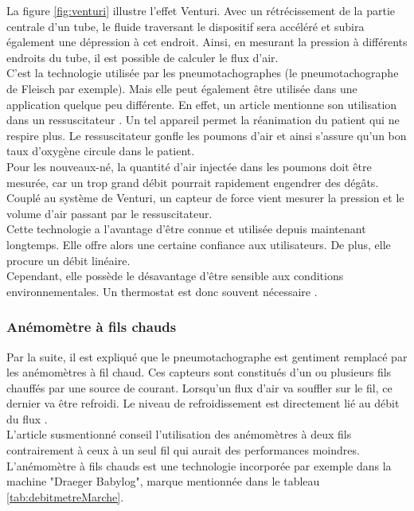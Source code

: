 La figure \ref{fig:venturi} illustre l'effet Venturi. Avec un rétrécissement de la partie centrale d'un tube, le fluide traversant le dispositif 
sera accéléré et subira également une dépression à cet endroit. Ainsi, en mesurant la pression à différents endroits du tube, il est possible 
de calculer le flux d'air. \\

C'est la technologie utilisée par les pneumotachographes (le pneumotachographe de Fleisch par exemple). Mais elle peut également être utilisée 
dans une application quelque peu différente. En effet, un article mentionne son utilisation dans un ressuscitateur \cite{jacq_ultra-low_2011}. 
Un tel appareil permet la réanimation du patient qui ne respire plus. Le ressuscitateur gonfle les poumons d'air et ainsi s'assure qu'un bon 
taux d'oxygène circule dans le patient. \\
Pour les nouveaux-né, la quantité d'air injectée dans les poumons doit être mesurée, car un trop grand débit pourrait rapidement engendrer 
des dégâts. \\
Couplé au système de Venturi, un capteur de force vient mesurer la pression et le volume d'air passant par le ressuscitateur. \\

Cette technologie a l'avantage d'être connue et utilisée depuis maintenant longtemps. Elle offre alors une certaine confiance aux utilisateurs. 
De plus, elle procure un débit linéaire. \\
Cependant, elle possède le désavantage d'être sensible aux conditions environnementales. Un thermostat est donc souvent nécessaire \cite{fischberg_pratique_2009}.

\subsubsection{Anémomètre à fils chauds}
Par la suite, il est expliqué que le pneumotachographe est gentiment remplacé par les anémomètres à fil chaud. Ces capteurs sont 
constitués d'un ou plusieurs fils chauffés par une source de courant. Lorsqu'un flux d'air va souffler sur le fil, ce dernier va être refroidi. 
Le niveau de refroidissement est directement lié au débit du flux \cite{oberg_biomedical_2011}. \\
L'article susmentionné conseil l'utilisation des anémomètres à deux fils contrairement à ceux à un seul fil qui aurait des performances 
moindres. 
L'anémomètre à fils chauds est une technologie incorporée par exemple dans la machine "Draeger Babylog", marque mentionnée dans le tableau \ref{tab:debitmetreMarche}. \\

